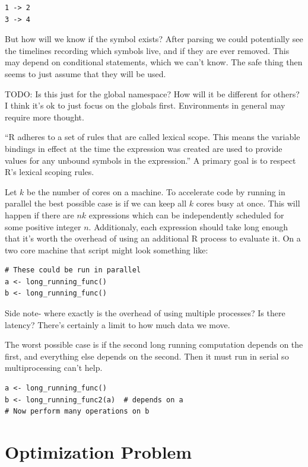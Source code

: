 \documentclass[12pt]{article}
\begin{document}
\begin{verbatim}
1 -> 2
3 -> 4
\end{verbatim}

But how will we know if the symbol exists? After parsing we could
potentially see the timelines recording which symbols live, and if they are
ever removed. This may depend on conditional statements, which we can't
know. The safe thing then seems to just assume that they will be used.

TODO: Is this just for the global namespace? How will it be different for
others? I think it's ok to just focus on the globals first. Environments in
general may require more thought.

``R adheres to a set of rules that are called lexical scope. This means the
variable bindings in effect at the time the expression was created are used
to provide values for any unbound symbols in the expression.''
\cite{Rlang} A primary goal is to respect R's lexical scoping rules.

Let $k$ be the number of cores on a machine.
To accelerate code by running in parallel the best possible case is if
we can keep all $k$ cores busy at once. This will happen if there are $nk$
expressions which can be independently scheduled for some positive integer
$n$. Additionaly, each expression should take long enough that
it's worth the overhead of using an additional R process to evaluate it.
On a two core machine that script might look something like:

\begin{verbatim}
# These could be run in parallel
a <- long_running_func()
b <- long_running_func()
\end{verbatim}

Side note- where exactly is the overhead of using multiple processes? Is
there latency? There's certainly a limit to how much data we move.

The worst possible case is if the second long running computation depends
on the first, and everything else depends on the second. Then it must run
in serial so multiprocessing can't help.

\begin{verbatim}
a <- long_running_func()
b <- long_running_func2(a)  # depends on a
# Now perform many operations on b
\end{verbatim}

\section{Optimization Problem}
\end{document}

